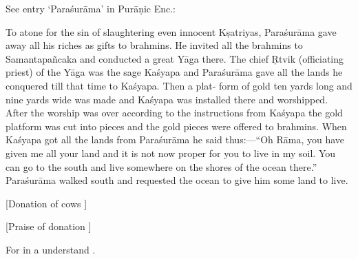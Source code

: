 { See entry `Paraśurāma' in Purāṇic Enc.:                 

                                 To atone for the sin of slaughtering even                                 innocent Kṣatriyas, Paraśurāma gave away all his                                 riches as gifts to brahmins. He invited all the brahmins                                 to Samantapañcaka and conducted a great Yāga there.                                 The chief Ṛtvik (officiating priest) of the Yāga was                                 the sage Kaśyapa and Paraśurāma gave all the lands                                 he conquered till that time to Kaśyapa. Then a plat-                                 form of gold ten yards long and nine yards wide was                                 made and Kaśyapa was installed there and worshipped.                                 After the worship was over according to the instructions                                 from Kaśyapa the gold platform was cut into pieces                                 and the gold pieces were offered to brahmins.                                 When Kaśyapa got all the lands from Paraśurāma he                                 said thus:—“Oh Rāma, you have given me all your                                 land and it is not now proper for you to live in my                                 soil. You can go to the south and live somewhere on                                 the shores of the ocean there.” Paraśurāma walked                                 south and requested the ocean to give him some land to                                 live.  }




\begin{center}{{[Donation of cows
]}}\end{center}








\begin{center}{{[Praise of donation
]}}\end{center}




{ For  in  a understand . }





